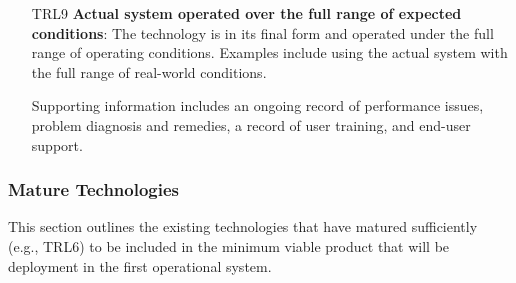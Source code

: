 \begin{enumerate}
    \item[\footnotesize TRL9] \textbf{Actual system operated over the full range of expected conditions}: The technology is in its final form and operated under the full range of operating conditions. Examples include using the actual system with the full range of real-world conditions.
    
    Supporting information includes an ongoing record of performance issues, problem diagnosis and remedies, a record of user training, and end-user support.
    
\end{enumerate}

\subsubsection{Mature Technologies}

This section outlines the existing technologies that have matured sufficiently (e.g., TRL6) to be included in the minimum viable product that will be deployment in the first operational system.

